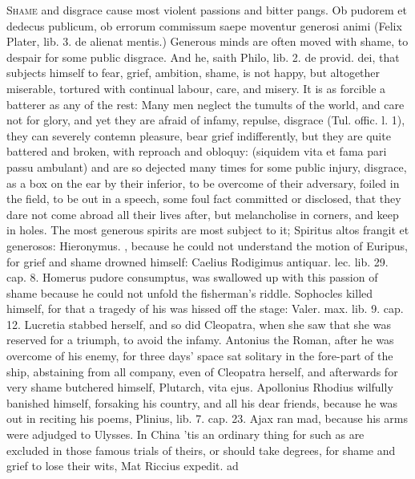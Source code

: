 {\lettrine{S}{hame} and disgrace cause most violent passions and bitter pangs. Ob
pudorem et dedecus publicum, ob errorum commissum saepe moventur
generosi animi (Felix Plater, lib. 3. de alienat mentis.) Generous
minds are often moved with shame, to despair for some public disgrace.
And he, saith Philo, lib. 2. de provid. dei, that subjects
himself to fear, grief, ambition, shame, is not happy, but altogether
miserable, tortured with continual labour, care, and misery. It is as
forcible a batterer as any of the rest: Many men neglect the
tumults of the world, and care not for glory, and yet they are afraid
of infamy, repulse, disgrace (Tul. offic. l. 1), they can severely
contemn pleasure, bear grief indifferently, but they are quite
battered and broken, with reproach and obloquy: (siquidem vita et
fama pari passu ambulant) and are so dejected many times for some
public injury, disgrace, as a box on the ear by their inferior, to be
overcome of their adversary, foiled in the field, to be out in a
speech, some foul fact committed or disclosed, \etc{} that they dare not
come abroad all their lives after, but melancholise in corners, and
keep in holes. The most generous spirits are most subject to it;
Spiritus altos frangit et generosos: Hieronymus. \Aristotle, because he
could not understand the motion of Euripus, for grief and shame drowned
himself: Caelius Rodigimus antiquar. lec. lib. 29. cap. 8. Homerus
pudore consumptus, was swallowed up with this passion of shame 
because he could not unfold the fisherman's riddle. Sophocles killed
himself, for that a tragedy of his was hissed off the stage:
Valer. max. lib. 9. cap. 12. Lucretia stabbed herself, and so did
Cleopatra, when she saw that she was reserved for a triumph, to
avoid the infamy. Antonius the Roman, after he was overcome of
his enemy, for three days' space sat solitary in the fore-part of the
ship, abstaining from all company, even of Cleopatra herself, and
afterwards for very shame butchered himself, Plutarch, vita ejus.
Apollonius Rhodius wilfully banished himself, forsaking his
country, and all his dear friends, because he was out in reciting his
poems, Plinius, lib. 7. cap. 23. Ajax ran mad, because his arms were
adjudged to Ulysses. In China 'tis an ordinary thing for such as are
excluded in those famous trials of theirs, or should take degrees, for
shame and grief to lose their wits, Mat Riccius expedit. ad
}
